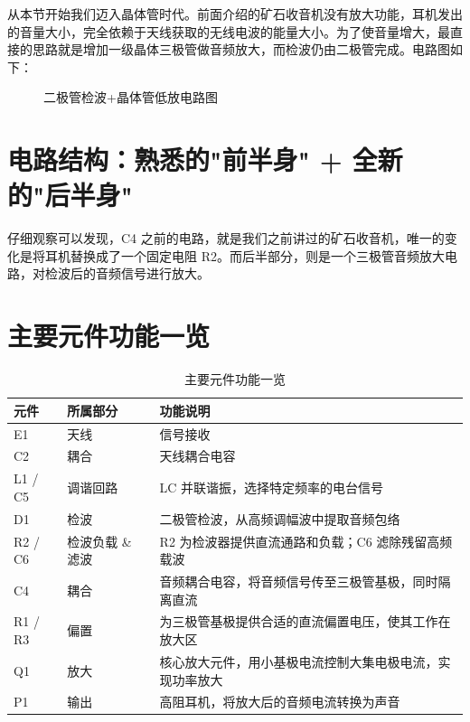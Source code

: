 \documentclass[12pt,UTF8]{ctexbook}
\begin{document}
从本节开始我们迈入晶体管时代。前面介绍的矿石收音机没有放大功能，耳机发出的音量大小，完全依赖于天线获取的无线电波的能量大小。为了使音量增大，最直接的思路就是增加一级晶体三极管做音频放大，而检波仍由二极管完成。电路图如下：

\begin{figure}[H]
	\centering
	\caption{二极管检波+晶体管低放电路图}
	\label{fig:diode-transistor-circuit}
\end{figure}

\section{电路结构：熟悉的"前半身" + 全新的"后半身"}

仔细观察可以发现，C4 之前的电路，就是我们之前讲过的矿石收音机，唯一的变化是将耳机替换成了一个固定电阻 R2。而后半部分，则是一个三极管音频放大电路，对检波后的音频信号进行放大。

\section{主要元件功能一览}

\begin{table}[H]
	\centering
	\begin{tabular}{|l|l|l|}
		\hline
		元件 & 所属部分 & 功能说明 \\
		\hline
		E1 & 天线 & 信号接收 \\
		\hline
		C2 & 耦合 & 天线耦合电容 \\
		\hline
		L1 / C5 & 调谐回路 & LC 并联谐振，选择特定频率的电台信号 \\
		\hline
		D1 & 检波 & 二极管检波，从高频调幅波中提取音频包络 \\
		\hline
		R2 / C6 & 检波负载 \& 滤波 & R2 为检波器提供直流通路和负载；C6 滤除残留高频载波 \\
		\hline
		C4 & 耦合 & 音频耦合电容，将音频信号传至三极管基极，同时隔离直流 \\
		\hline
		R1 / R3 & 偏置 & 为三极管基极提供合适的直流偏置电压，使其工作在放大区 \\
		\hline
		Q1 & 放大 & 核心放大元件，用小基极电流控制大集电极电流，实现功率放大 \\
		\hline
		P1 & 输出 & 高阻耳机，将放大后的音频电流转换为声音 \\
		\hline
	\end{tabular}
	\caption{主要元件功能一览}
	\label{tab:component-functions}
\end{table}
\end{document}
